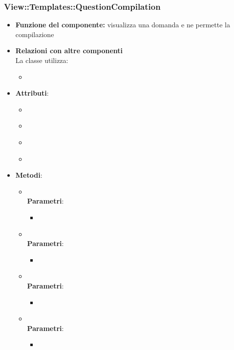  \subsubsection{View::Templates::QuestionCompilation}
 \begin{itemize}
 \item\textbf{Funzione del componente:} visualizza una domanda e ne permette la compilazione
 \item\textbf{Relazioni con altre componenti}\\
 La classe utilizza:
 	\begin{itemize}
 		\item
 	\end{itemize}
 \item\textbf{Attributi}:
 	\begin{itemize}
 		\item\code{}\\
 		\item\code{}\\
 		\item\code{}\\
 		\item\code{}\\
 	\end{itemize}
 \item\textbf{Metodi}:
 	\begin{itemize}
 		\item\code{}\\
 		\textbf{Parametri}:
 			\begin{itemize}
 				\item\code{}\\
 			\end{itemize}
 		\item\code{}\\
 		\textbf{Parametri}:
 			\begin{itemize}
 				\item\code{}\\
 			\end{itemize}
 		\item\code{}\\
 		\textbf{Parametri}:
 			\begin{itemize}
 				\item\code{}\\
 			\end{itemize}
 		\item\code{}\\
 		\textbf{Parametri}:
 			\begin{itemize}
 				\item\code{}\\
 			\end{itemize}
 	\end{itemize}
 \end{itemize}
 

